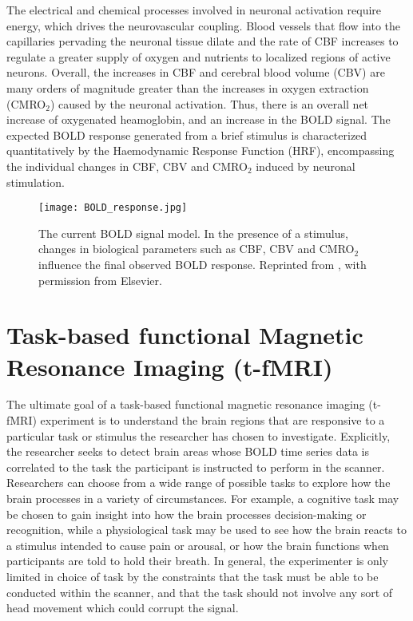 The electrical and chemical processes involved in neuronal activation require energy, which drives the neurovascular coupling. Blood vessels that flow into the capillaries pervading the neuronal tissue dilate and the rate of CBF increases to regulate a greater supply of oxygen and nutrients to localized regions of active neurons. Overall, the increases in CBF and cerebral blood volume (CBV) are many orders of magnitude greater than the increases in oxygen extraction (CMRO$_{2}$) caused by the neuronal activation. Thus, there is an overall net increase of oxygenated heamoglobin, and an increase in the BOLD signal. The expected BOLD response generated from a brief stimulus is characterized quantitatively by the Haemodynamic Response Function (HRF), encompassing the individual changes in CBF, CBV and CMRO$_{2}$ induced by neuronal stimulation. 

\begin{figure}[htbp]
\centering
	\texttt{[image: BOLD\_response.jpg]}	
\caption{The current BOLD signal model. In the presence of a stimulus, changes in biological parameters such as CBF, CBV and CMRO$_{2}$ influence the final observed BOLD response. Reprinted from \citet*{Buxton2012-ly}, with permission from Elsevier.}
\end{figure}


\section{Task-based functional Magnetic Resonance Imaging (t-fMRI)} 
\label{sec:t-fMRI}

The ultimate goal of a task-based functional magnetic resonance imaging (t-fMRI) experiment is to understand the brain regions that are responsive to a particular task or stimulus the researcher has chosen to investigate. Explicitly, the researcher seeks to detect brain areas whose BOLD time series data is correlated to the task the participant is instructed to perform in the scanner. Researchers can choose from a wide range of possible tasks to explore how the brain processes in a variety of circumstances. For example, a cognitive task may be chosen to gain insight into how the brain processes decision-making or recognition, while a physiological task may be used to see how the brain reacts to a stimulus intended to cause pain or arousal, or how the brain functions when participants are told to hold their breath. In general, the experimenter is only limited in choice of task by the constraints that the task must be able to be conducted within the scanner, and that the task should not involve any sort of head movement which could corrupt the signal. 

